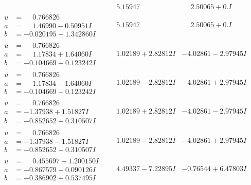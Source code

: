 \documentclass[1p]{elsarticle_modified}
\theoremstyle{definition}
\begin{document}
$$\begin{array}{c|c|c}
 & \phantom{-}5.15947\phantom{ +0.000000I} & \phantom{-}2.50065 + 0. I\phantom{ +0.000000I} \\ \hline\begin{aligned}
u &= \phantom{-}0.766826\phantom{ +0.000000I} \\
a &= \phantom{-}1.46990 - 0.50951 I \\
b &= -0.020195 - 1.342860 I\end{aligned}
 & \phantom{-}5.15947\phantom{ +0.000000I} & \phantom{-}2.50065 + 0. I\phantom{ +0.000000I} \\ \hline\begin{aligned}
u &= \phantom{-}0.766826\phantom{ +0.000000I} \\
a &= \phantom{-}1.17834 + 1.64060 I \\
b &= -0.104669 + 0.123242 I\end{aligned}
 & \phantom{-}1.02189 + 2.82812 I & -4.02861 - 2.97945 I \\ \hline\begin{aligned}
u &= \phantom{-}0.766826\phantom{ +0.000000I} \\
a &= \phantom{-}1.17834 - 1.64060 I \\
b &= -0.104669 - 0.123242 I\end{aligned}
 & \phantom{-}1.02189 - 2.82812 I & -4.02861 + 2.97945 I \\ \hline\begin{aligned}
u &= \phantom{-}0.766826\phantom{ +0.000000I} \\
a &= -1.37938 + 1.51827 I \\
b &= -0.852652 + 0.310507 I\end{aligned}
 & \phantom{-}1.02189 + 2.82812 I & -4.02861 - 2.97945 I \\ \hline\begin{aligned}
u &= \phantom{-}0.766826\phantom{ +0.000000I} \\
a &= -1.37938 - 1.51827 I \\
b &= -0.852652 - 0.310507 I\end{aligned}
 & \phantom{-}1.02189 - 2.82812 I & -4.02861 + 2.97945 I \\ \hline\begin{aligned}
u &= \phantom{-}0.455697 + 1.200150 I \\
a &= -0.867579 - 0.090126 I \\
b &= -0.386902 + 0.537495 I\end{aligned}
 & \phantom{-}4.49337 - 7.22895 I & -0.76544 + 6.47803 I \\ \hline\begin{aligned}

\end{aligned}
\end{array}$$
\end{document}
